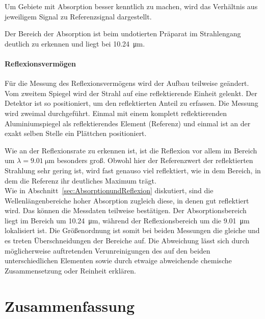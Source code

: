 \documentclass[a4paper,twoside,final]{article}
\begin{document}


Um Gebiete mit Absorption besser kenntlich zu machen, wird das Verhältnis aus jeweiligem Signal zu Referenzsignal dargestellt.


\FloatBarrier
Der Bereich der Absorption ist beim undotierten Präparat im Strahlengang deutlich zu erkennen und liegt bei \SI{10.24}{\micro\meter}.

\paragraph{Reflexionsvermögen}
Für die Messung des Reflexionsvermögens wird der Aufbau teilweise geändert. Vom zweitem Spiegel wird der Strahl auf eine reflektierende Einheit gelenkt. Der Detektor ist so positioniert, um den reflektierten Anteil zu erfassen. Die Messung wird zweimal durchgeführt. Einmal mit einem komplett reflektierenden Aluminiumspiegel als reflektierendes Element (Referenz) und einmal ist an der exakt selben Stelle ein  Plättchen positioniert.



\FloatBarrier
Wie an der Reflexionsrate zu erkennen ist, ist die Reflexion vor allem im Bereich um $\lambda = \SI{9.01}{\micro\meter}$ besonders groß. Obwohl hier der Referenzwert der reflektierten Strahlung sehr gering ist, wird fast genauso viel reflektiert, wie in dem Bereich, in dem die Referenz ihr deutliches Maximum trägt.\\

Wie in Abschnitt~\ref{sec:AbsorptionundReflexion} diskutiert, sind die Wellenlängenbereiche hoher Absorption zugleich diese, in denen gut reflektiert wird. Das können die Messdaten teilweise bestätigen. Der Absorptionsbereich liegt im Bereich um \SI{10.24}{\micro\meter}, während der Reflexionsbereich um die \SI{9.01}{\micro\meter} lokalisiert ist. Die Größenordnung ist somit bei beiden Messungen die gleiche und es treten Überschneidungen der Bereiche auf. Die Abweichung lässt sich durch möglicherweise auftretenden Verunreinigungen des  auf den beiden unterschiedlichen Elementen sowie durch etwaige abweichende chemische Zusammensetzung oder Reinheit erklären.



\newpage
\section{Zusammenfassung}



{}

\end{document}
